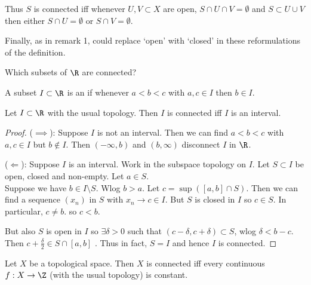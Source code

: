 \begin{remark}
\begin{enumerate}
        Thus $S$ is connected iff whenever $U,V\subset X$ are open, $S\cap U\cap V=\emptyset$ and $S \subset U \cup V$ then either $S\cap U=\emptyset$ or $S\cap V=\emptyset.$
        
        Finally, as in remark 1, could replace `open' with `closed' in these reformulations of the definition.
    \end{enumerate} 
\end{remark}

\begin{question}
    Which subsets of $\R$ are connected?
\end{question}

\begin{definition}[Interval]
    A subset $I\subset \R$ is an  if whenever $a<b<c$ with $a, c \in I$ then $b \in I$.
\end{definition}

\begin{proposition} \label{prp:41}      
    Let $I\subset \R$ with the usual topology. Then $I$ is connected iff $I$ is an interval.
\end{proposition}

\begin{proof}
    ($\implies$): Suppose $I$ is not an interval. Then we can find $a<b<c$ with $a,c\in I$ but $b\not\in I$. Then $(-\infty,b)$ and $(b,\infty)$ disconnect $I$ in $\R$.

    ($\Longleftarrow$): Suppose $I$ is an interval. Work in the subspace topology on $I$. Let $S\subset I$ be open, closed and non-empty. Let $a\in S$. \\
    Suppose we have $b\in I\setminus S$. Wlog $b>a$. Let $c=\sup([a,b]\cap S)$. Then we can find a sequence $(x_n)$ in $S$ with $x_n\to c\in I$. But $S$ is closed in $I$ so $c\in S$. In particular, $c\neq b$. so $c<b$.

    But also $S$ is open in $I$ so $\exists \delta>0$ such that $(c-\delta, c+\delta)\subset S$, wlog $\delta < b-c$. Then $c +\frac{\delta}{2}\in S\cap [a,b]$ \Lightning. 
    Thus in fact, $S=I$ and hence $I$ is connected.
\end{proof}

\begin{theorem} \label{thm:42}
    Let $X$ be a topological space. Then $X$ is connected iff every continuous $f: X\to \Z$ (with the usual topology) is constant.
\end{theorem}

